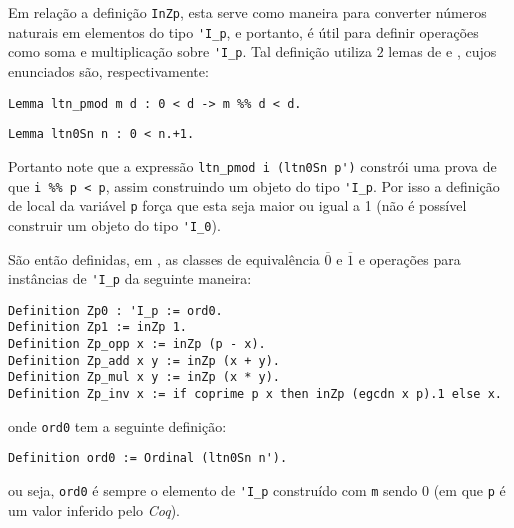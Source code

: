Em relação a definição \lstinline[language = coq]{InZp}, esta serve como maneira para converter números naturais em elementos do tipo \lstinline[language = coq]{'I_p}, e portanto, é útil para definir operações como soma e multiplicação sobre \lstinline[language = coq]{'I_p}. Tal definição utiliza $2$ lemas de \cite{mathcomp-div} e \cite{mathcomp-ssrnat}, cujos enunciados são, respectivamente:
    \begin{lstlisting}[language=coq,frame=single,tabsize=1]
Lemma ltn_pmod m d : 0 < d -> m %% d < d.
    \end{lstlisting}
    \begin{lstlisting}[language=coq,frame=single,tabsize=1]
Lemma ltn0Sn n : 0 < n.+1.
    \end{lstlisting}
Portanto note que a expressão \lstinline[language = coq]{ltn_pmod i (ltn0Sn p')} constrói uma prova de que \lstinline[language = coq]{i %% p < p}, assim construindo um objeto do tipo \lstinline[language = coq]{'I_p}. Por isso a definição de local da variável \lstinline[language = coq]{p} força que esta seja maior ou igual a 1 (não é possível construir um objeto do tipo \lstinline[language = coq]{'I_0}).

São então definidas, em \cite{mathcomp-zmodp}, as classes de equivalência $\overline{0}$ e $\overline{1}$ e operações para instâncias de \lstinline[language = coq]{'I_p} da seguinte maneira:
    \begin{lstlisting}[language=coq,frame=single,tabsize=1]
Definition Zp0 : 'I_p := ord0.
Definition Zp1 := inZp 1.
Definition Zp_opp x := inZp (p - x).
Definition Zp_add x y := inZp (x + y).
Definition Zp_mul x y := inZp (x * y).
Definition Zp_inv x := if coprime p x then inZp (egcdn x p).1 else x.
    \end{lstlisting}
onde \lstinline[language = coq]{ord0} tem a seguinte definição:
    \begin{lstlisting}[language=coq,frame=single,tabsize=1]
Definition ord0 := Ordinal (ltn0Sn n').
    \end{lstlisting}
ou seja, \lstinline[language = coq]{ord0} é sempre o elemento de \lstinline[language = coq]{'I_p} construído com \lstinline[language = coq]{m} sendo 0 (em que \lstinline[language = coq]{p} é um valor inferido pelo \textit{Coq}).

